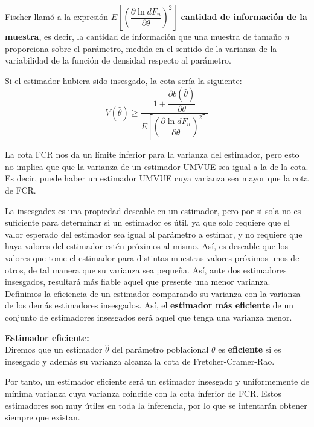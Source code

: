 Fischer llam\'o a la expresi\'on $E\left[\left(\dfrac{\partial\ln{dF_n}}{\partial\theta}\right)^2\right]$ \textbf{cantidad de informaci\'on de la muestra}, es decir, la cantidad de informaci\'on que una muestra de tama\~no $n$ proporciona sobre el par\'ametro, medida en el sentido de la varianza de la variabilidad de la funci\'on de densidad respecto al par\'ametro.

Si el estimador hubiera sido insesgado, la cota ser\'ia la siguiente:
\begin{equation*}
V(\hat{\theta})\geq \dfrac{1+\dfrac{\partial b(\hat{\theta})}{\partial\theta}}{E\left[\left(\dfrac{\partial\ln{dF_n}}{\partial\theta}\right)^2\right]}
\end{equation*}

La cota FCR nos da un l\'imite inferior para la varianza del estimador, pero esto no implica que que la varianza de un estimador UMVUE sea igual a la de la cota. Es decir, puede haber un estimador UMVUE cuya varianza sea mayor que la cota de FCR.


La insesgadez es una propiedad deseable en un estimador, pero por si sola no es suficiente para determinar si un estimador es \'util, ya que solo requiere que el valor esperado del estimador sea igual al par\'ametro a estimar, y no requiere que haya valores del estimador est\'en pr\'oximos al mismo. Así, es deseable que los valores que tome el estimador para distintas muestras valores pr\'oximos unos de otros, de tal manera que su varianza sea peque\~na. Así, ante dos estimadores insesgados, resultar\'a m\'as fiable aquel que presente una menor varianza. Definimos la eficiencia de un estimador comparando su varianza con la varianza de los dem\'as estimadores insesgados. As\'i, el \textbf{estimador m\'as eficiente} de un conjunto de estimadores insesgados ser\'a aquel que tenga una varianza menor.

\begin{definicion}
\textbf{Estimador eficiente:}\\
Diremos que un estimador $\hat{\theta}$ del par\'ametro poblacional $\theta$ es \textbf{eficiente} si es insesgado y adem\'as su varianza alcanza la cota de Fretcher-Cramer-Rao.
\end{definicion}

Por tanto, un estimador eficiente ser\'a un estimador insesgado y uniformemente de m\'inima varianza cuya varianza coincide con la cota inferior de FCR. Estos estimadores son muy \'utiles en toda la inferencia, por lo que se intentar\'an obtener siempre que existan.

